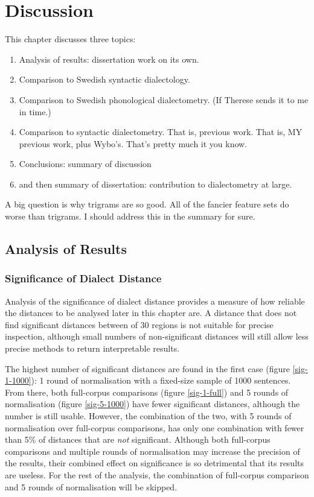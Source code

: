 \chapter{Discussion}

This chapter discusses three topics:

\begin{enumerate}
\item Analysis of results: dissertation work on its own.
\item Comparison to Swedish syntactic dialectology.
\item Comparison to Swedish phonological dialectometry. (If Therese
  sends it to me in time.)
\item Comparison to syntactic dialectometry.
  That is, previous work. That is, MY previous work, plus
  Wybo's. That's pretty much it you know.
\item Conclusions: summary of discussion
\item and then summary of dissertation: contribution to dialectometry at large.
\end{enumerate}

A big question is why trigrams are so good. All of the fancier feature
sets do worse than trigrams. I should address this in the summary for
sure.

\section{Analysis of Results}


\subsection{Significance of Dialect Distance}

Analysis of the significance of dialect distance provides a measure of
how reliable the distances to be analysed later in this chapter are. A
distance that does not find significant distances between of 30
regions is not suitable for precise inspection, although small numbers
of non-significant distances will still allow less precise methods to
return interpretable results.

The highest number of significant distances are found in the first
case (figure \ref{sig-1-1000}): 1 round of normalisation with a
fixed-size sample of 1000 sentences. From there, both full-corpus
comparisons (figure \ref{sig-1-full}) and 5 rounds of normalisation
(figure \ref{sig-5-1000}) have fewer significant distances, although
the number is still usable. However, the combination of the two, with
5 rounds of normalisation over full-corpus comparisons, has only one
combination with fewer than 5\% of distances that are {\it not}
significant. Although both full-corpus comparisons and multiple rounds
of normalisation may increase the precision of the results, their
combined effect on significance is so detrimental that its results are
useless. For the rest of the analysis, the combination of full-corpus
comparison and 5 rounds of normalisation will be skipped.


